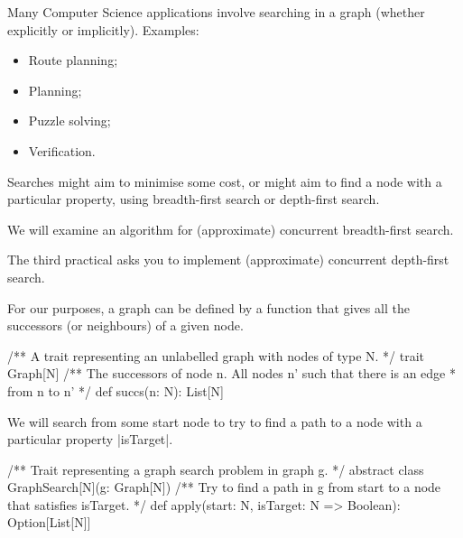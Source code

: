 \begin{slide}

Many Computer Science applications involve searching in a graph (whether
explicitly or implicitly).  Examples:
%
\begin{itemize}
\item Route planning;

\item Planning;

\item Puzzle solving;

\item Verification.
\end{itemize}
%
Searches might aim to minimise some cost, or might aim to find a node with a
particular property, using breadth-first search or depth-first search.

We will examine an algorithm for (approximate) concurrent breadth-first search.

The third practical asks you to implement (approximate) concurrent depth-first search.
\end{slide}


\begin{slide}

For our purposes, a graph can be defined by a function that gives all the
successors (or neighbours) of a given node.
%
\begin{scala}
/** A trait representing an unlabelled graph with nodes of type N. */
trait Graph[N]{
  /** The successors of node n.  All nodes n' such that there is an edge
    * from n to n' */
  def succs(n: N): List[N]
}
\end{scala}

We will search from some start node to try to find a path to a node with a
particular property |isTarget|.
\begin{scala}
/** Trait representing a graph search problem in graph g. */
abstract class GraphSearch[N](g: Graph[N]){
  /** Try to find a path in g from start to a node that satisfies isTarget. */
  def apply(start: N, isTarget: N => Boolean): Option[List[N]]
}
\end{scala}
\end{slide}


